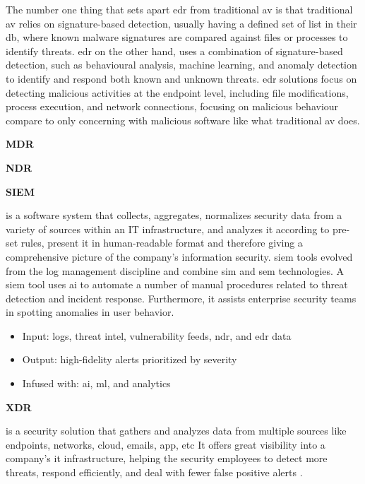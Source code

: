\begin{multicols}{2}
      The number one thing that sets apart \acrshort{edr} from traditional \acrshort{av} is that traditional \acrshort{av} relies on
      signature-based detection, usually having a defined set of list in their \acrshort{db}, where known malware signatures are compared
      against files or processes to identify threats. \acrshort{edr} on the other hand, uses a combination of signature-based detection, such
      as behavioural analysis, machine learning, and anomaly detection to identify and respond both known and unknown threats. \acrshort{edr}
      solutions focus on detecting malicious activities at the endpoint level, including file modifications, process execution, and network
      connections, focusing on malicious behaviour compare to only concerning with malicious software like what traditional \acrshort{av} does.

      \textbf{MDR}

      \textbf{NDR} \label{sec:ndr}

      \textbf{SIEM}

      is a software system that collects, aggregates, normalizes security data from a variety of sources within an IT infrastructure, and
      analyzes it according to pre-set rules, present it in human-readable format and therefore giving a comprehensive picture of the company's
      information security. \acrshort{siem} tools evolved from the log management discipline and combine \acrshort{sim} and \acrshort{sem} technologies.
      A \acrshort{siem} tool uses \acrshort{ai} to automate a number of manual procedures related to threat detection and incident response. Furthermore,
      it assists enterprise security teams in spotting anomalies in user behavior.

      \begin{itemize}
            \item Input: logs, threat intel, vulnerability feeds, \acrshort{ndr}, and \acrshort{edr} data
            \item Output: high-fidelity alerts prioritized by severity
            \item Infused with: \acrshort{ai}, \acrshort{ml}, and analytics
      \end{itemize}

      \textbf{XDR}

      is a security solution that gathers and analyzes data from multiple sources like endpoints, networks, cloud, emails, app, \acrshort{etc} It offers
      great visibility into a company's \acrshort{it} infrastructure, helping the security employees to detect more threats, respond efficiently, and
      deal with fewer false positive alerts \cite{xdrIDC}.


\end{multicols}
